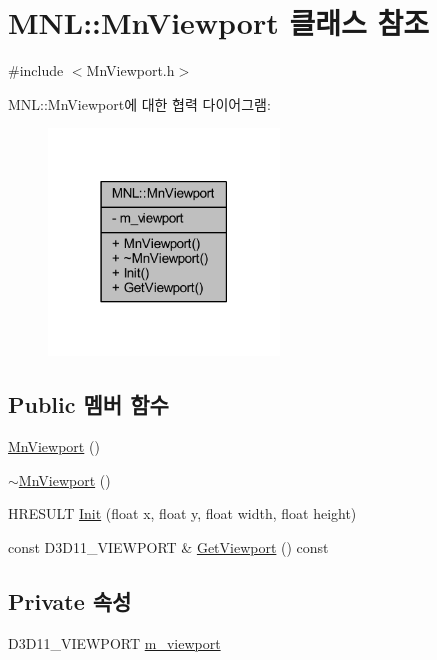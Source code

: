 \hypertarget{class_m_n_l_1_1_mn_viewport}{}\section{M\+NL\+:\+:Mn\+Viewport 클래스 참조}
\label{class_m_n_l_1_1_mn_viewport}


{\ttfamily \#include $<$Mn\+Viewport.\+h$>$}



M\+NL\+:\+:Mn\+Viewport에 대한 협력 다이어그램\+:\nopagebreak
\begin{figure}[H]
\begin{center}
\leavevmode
\includegraphics[width=174pt]{class_m_n_l_1_1_mn_viewport__coll__graph}
\end{center}
\end{figure}
\subsection*{Public 멤버 함수}
\begin{DoxyCompactItemize}
\item 
\hyperlink{class_m_n_l_1_1_mn_viewport_a4b457a6de0a9de183f8dd8941faae6d4}{Mn\+Viewport} ()
\item 
\hyperlink{class_m_n_l_1_1_mn_viewport_a4bb6c52bc7a44b3161e276ab47725c39}{$\sim$\+Mn\+Viewport} ()
\item 
H\+R\+E\+S\+U\+LT \hyperlink{class_m_n_l_1_1_mn_viewport_ae96cefe1ab1b8ffa43b9c706ded1af7f}{Init} (float x, float y, float width, float height)
\item 
const D3\+D11\+\_\+\+V\+I\+E\+W\+P\+O\+RT \& \hyperlink{class_m_n_l_1_1_mn_viewport_aa5ab68c8398c87e23afbc354d611fad0}{Get\+Viewport} () const
\end{DoxyCompactItemize}
\subsection*{Private 속성}
\begin{DoxyCompactItemize}
\item 
D3\+D11\+\_\+\+V\+I\+E\+W\+P\+O\+RT \hyperlink{class_m_n_l_1_1_mn_viewport_a7d14dcbfd2762a2a65c8c408bf4e9c1f}{m\+\_\+viewport}
\end{DoxyCompactItemize}


